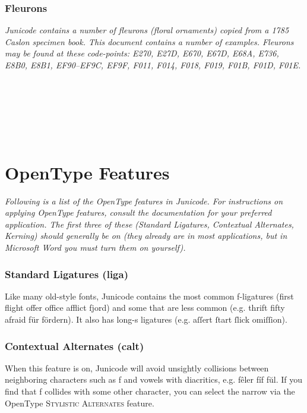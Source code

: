 \documentclass[12pt,a4paper,openany]{book}
\newcommand{\saltb}[1]{{\addfontfeatures{Alternate=1}{#1}}}
\begin{document}
\subsection*{Fleurons}

{\small\itshape Junicode contains a number of fleurons (floral
  ornaments) copied from a 1785 Caslon specimen book. This document
  contains a number of examples. Fleurons may be found at these
  code-points: E270, E27D, E670, E67D, E68A, E736, E8B0, E8B1,
  EF90–EF9C, EF9F, F011, F014, F018, F019, F01B, F01D, F01E.}

\begin{center}
\huge    \\
 \\[0.7ex]
\\[0.7ex]
\\
 
\end{center}

\chapter*{\color{myBlue}OpenType Features}

{\itshape Following is a list of the OpenType features in
  Junicode. For instructions on applying OpenType features, consult
  the documentation for your preferred application. The first three of
  these (Standard Ligatures, Contextual Alternates, Kerning) should
  generally be on (they already are in most applications, but in
  Microsoft Word you must turn them on yourself).}

\subsection*{Standard Ligatures (liga)}

Like many old-style fonts, Junicode contains the most common f-ligatures
(first flight offer office afflict fjord) and some that are less common
(e.g. thrift fifty afraid für fördern).  It
also has long-s ligatures (e.g. aſſert ſtart ſlick omiſſion).

\subsection*{Contextual Alternates (calt)}

When this feature is on, Junicode
will avoid unsightly collisions between neighboring characters such as
f and vowels with diacritics, e.g.  fêler fíf fŭl. If you find that f
collides with some other character, you can select the narrow
\saltb{f} via the OpenType {\scshape Stylistic Alternates} feature.
\end{document}
